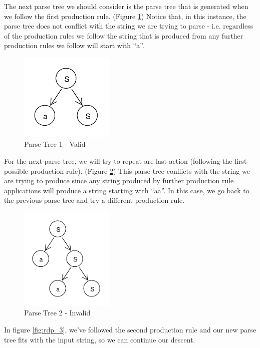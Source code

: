 \documentclass[11pt]{article}
\begin{document}
{The next parse tree we should consider is the parse tree that is generated when we follow the first 
production rule. (Figure \ref{fig:rdp_1}) Notice that, in this instance, the parse tree does not conflict with
the string we are trying to parse - i.e. regardless of the production rules we follow the string that is
produced from any further production rules we follow will start with ``a''.

\begin{figure}[h!]
    \centering
    \includegraphics[width=0.4\textwidth,natwidth=30,natheight=30]{umlet/rdp_1.pdf}
    \caption{Parse Tree 1 - Valid}
    \label{fig:rdp_1}
\end{figure}

For the next parse tree, we will try to repeat are last action (following the first possible production rule).
(Figure \ref{fig:rdp_2}) This parse tree conflicts with the string we are trying to produce since any
string produced by further production rule applications will produce a string starting with ``aa''.
In this case, we go back to the previous parse tree and try a different production rule.

\begin{figure}[h!]
    \centering
    \includegraphics[width=0.4\textwidth,natwidth=30,natheight=30]{umlet/rdp_2.pdf}
    \caption{Parse Tree 2 - Invalid}
    \label{fig:rdp_2}
\end{figure}

In figure \ref{fig:rdp_3}, we've followed the second production rule
and our new parse tree fits with the input string, so we can continue our descent.

}
\end{document}
